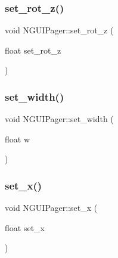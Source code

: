 \hypertarget{class_n_g_u_i_pager_a5adc12311ecd1f37510419b6e2bdd6b5}{}\label{class_n_g_u_i_pager_a5adc12311ecd1f37510419b6e2bdd6b5} 
\subsubsection{\texorpdfstring{set\+\_\+rot\+\_\+z()}{set\_rot\_z()}}
{\footnotesize\ttfamily void N\+G\+U\+I\+Pager\+::set\+\_\+rot\+\_\+z (\begin{DoxyParamCaption}\item[{float}]{set\+\_\+rot\+\_\+z }\end{DoxyParamCaption})}

\hypertarget{class_n_g_u_i_pager_a944ee3b9bf2748f434387f177745521b}{}\label{class_n_g_u_i_pager_a944ee3b9bf2748f434387f177745521b} 
\subsubsection{\texorpdfstring{set\+\_\+width()}{set\_width()}}
{\footnotesize\ttfamily void N\+G\+U\+I\+Pager\+::set\+\_\+width (\begin{DoxyParamCaption}\item[{float}]{w }\end{DoxyParamCaption})}

\hypertarget{class_n_g_u_i_pager_ae53a6ed7efb9627b14a0e0657756203d}{}\label{class_n_g_u_i_pager_ae53a6ed7efb9627b14a0e0657756203d} 
\subsubsection{\texorpdfstring{set\+\_\+x()}{set\_x()}}
{\footnotesize\ttfamily void N\+G\+U\+I\+Pager\+::set\+\_\+x (\begin{DoxyParamCaption}\item[{float}]{set\+\_\+x }\end{DoxyParamCaption})}

\hypertarget{class_n_g_u_i_pager_a549c2d0ef033bffc93cefd6da82373d7}{}\label{class_n_g_u_i_pager_a549c2d0ef033bffc93cefd6da82373d7} 
